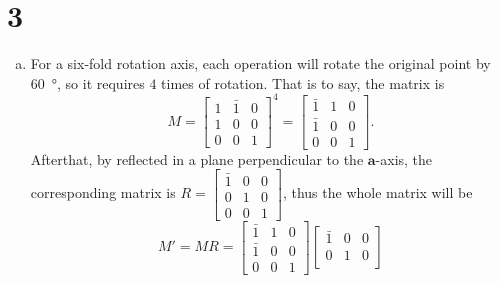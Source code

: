 \documentclass[openany]{homework}
\begin{document}
\section*{3}
\begin{enumerate}[a.]
        \item For a six-fold rotation axis, each operation will rotate the original point by \SI{60}{\degree}, so it requires $4$ times of rotation.
              That is to say, the matrix is
              \begin{equation}
                      M = \begin{bmatrix}
                              1 & \bar{1} & 0 \\
                              1 & 0       & 0 \\
                              0 & 0       & 1
                      \end{bmatrix}^4 =
                      \begin{bmatrix}
                              \bar{1} & 1 & 0 \\
                              \bar{1} & 0 & 0 \\
                              0       & 0 & 1
                      \end{bmatrix}.
              \end{equation}
              Afterthat, by reflected in a plane perpendicular to the $\bm{a}$-axis, the corresponding matrix is
              $R = \left[\begin{smallmatrix}
                                      \bar{1} & 0 & 0\\
                                      0           & 1 & 0\\
                                      0           & 0 & 1
                              \end{smallmatrix}\right]$,
              thus the whole matrix will be
              \begin{equation}
                      M' = M R =\begin{bmatrix}
                              \bar{1} & 1 & 0 \\
                              \bar{1} & 0 & 0 \\
                              0       & 0 & 1
                      \end{bmatrix}
                      \begin{bmatrix}
                              \bar{1} & 0 & 0 \\
                              0       & 1 & 0 \\

\end{bmatrix}
\end{equation}
\end{enumerate}
\end{document}
